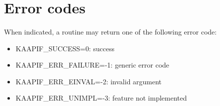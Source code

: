 \documentclass[a4paper, 11pt]{article}
\begin{document}
\newpage
\section{Error codes}
\paragraph{}
When indicated, a routine may return one of the following error code:
\begin{itemize}
\item KAAPIF\_SUCCESS=0: success
\item KAAPIF\_ERR\_FAILURE=-1: generic error code
\item KAAPIF\_ERR\_EINVAL=-2: invalid argument
\item KAAPIF\_ERR\_UNIMPL=-3: feature not implemented
\end{itemize}
\end{document}
